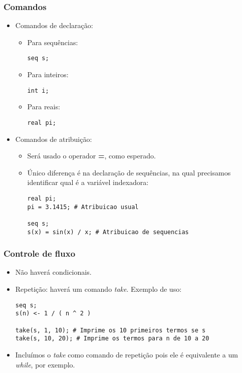 \documentclass{beamer}
\begin{document}
\begin{frame}[fragile]
  \frametitle{Comandos}
  \begin{itemize}
  \item Comandos de declara\c c\~ao:
    \begin{itemize}
    \item Para sequ\^encias:
\begin{verbatim}
seq s;
\end{verbatim}
    \item Para inteiros:
\begin{verbatim}
int i;
\end{verbatim}
    \item Para reais:
\begin{verbatim}
real pi;
\end{verbatim}
    \end{itemize}
  \item Comandos de atribui\c c\~ao:
    \begin{itemize}
    \item Ser\'a usado o operador \textbf{=}, como esperado.
    \item \'Unico diferen\c ca \'e na declara\c c\~ao de sequ\^encias,
      na qual precisamos identificar qual \'e a vari\'avel indexadora:
\begin{verbatim}
real pi;
pi = 3.1415; # Atribuicao usual

seq s;
s(x) = sin(x) / x; # Atribuicao de sequencias
\end{verbatim}
    \end{itemize}
  \end{itemize}
\end{frame}

\begin{frame}[fragile]
  \frametitle{Controle de fluxo}
  \begin{itemize}
  \item N\~ao haver\'a condicionais.
  \item Repeti\c c\~ao: haver\'a um comando \emph{take}. Exemplo de
    uso:
\begin{verbatim}
seq s;
s(n) <- 1 / ( n ^ 2 )

take(s, 1, 10); # Imprime os 10 primeiros termos se s
take(s, 10, 20); # Imprime os termos para n de 10 a 20
\end{verbatim}
  \item Inclu\'imos o \emph{take} como comando de repeti\c c\~ao pois
    ele \'e equivalente a um \emph{while}, por exemplo.
  \end{itemize}
\end{frame}
\end{document}
